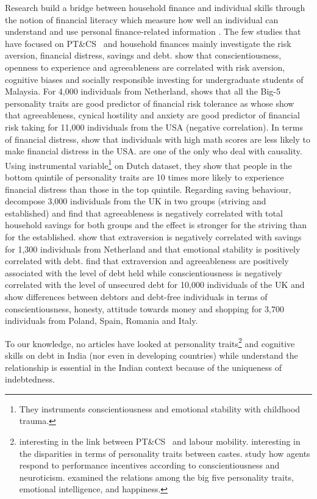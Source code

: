 \documentclass[a4paper, 11pt, onecolumn]{article}
\newcommand{\PTCS}{PT\&CS}
\begin{document}
Research build a bridge between household finance and individual skills through the notion of financial literacy which measure how well an individual can understand and use personal finance-related information \citep{Huston2010, Hastings2013, Gaurav2012, Klapper2012, Horn2021}.
The few studies that have focused on \PTCS~ and household finances mainly investigate the risk aversion, financial distress, savings and debt.
\cite{Nga2013} show that conscientiousness, openness to experience and agreeableness are correlated with risk aversion, cognitive biases and socially responsible investing for undergraduate students of Malaysia.
For 4,000 individuals from Netherland, \cite{Pinjisakikool2017b} shows that all the Big-5 personality traits are good predictor of financial risk tolerance as \cite{Bucciol2017} whose show that agreeableness, cynical hostility and anxiety are good predictor of financial risk taking for 11,000 individuals from the USA (negative correlation).
In terms of financial distress, \cite{Agarwal2013} show that individuals with high math scores are less likely to make financial distress in the USA.
\cite{Parise2019} are one of the only who deal with causality.
Using instrumental variable\footnote{They instruments conscientiousness and emotional stability with childhood trauma.} on Dutch dataset, they show that people in the bottom quintile of personality traits are 10 times more likely to experience financial distress than those in the top quintile.
Regarding saving behaviour, \cite{Gerhard2018} decompose 3,000 individuals from the UK in two groups (striving and established) and find that agreeableness is negatively correlated with total household savings for both groups and the effect is stronger for the striving than for the established.
\cite{Nyhus2001} show that extraversion is negatively correlated with savings for 1,300 individuals from Netherland and that emotional stability is positively correlated with debt.
\cite{Brown2014} find that extraversion and agreeableness are positively associated with the level of debt held while conscientiousness is negatively correlated with the level of unsecured debt for 10,000 individuals of the UK and \cite{Forlicz2019} show differences between debtors and debt-free individuals in terms of conscientiousness, honesty, attitude towards money and shopping for 3,700 individuals from Poland, Spain, Romania and Italy.

To our knowledge, no articles have looked at personality traits\footnote{\cite{Michiels2021} interesting in the link between \PTCS~ and labour mobility. \cite{Dasgupta2020} interesting in the disparities in terms of personality traits between castes. \cite{Donato2017} study how agents respond to performance incentives according to conscientiousness and neuroticism. \cite{Hafen2010} examined the relations among the big five personality traits, emotional intelligence, and happiness.} and cognitive skills on debt in India (nor even in developing countries) while understand the relationship is essential in the Indian context because of the uniqueness of indebtedness.
\end{document}
